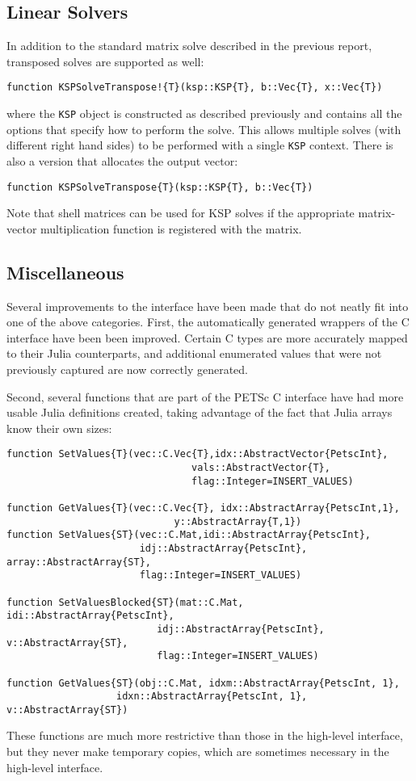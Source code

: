\documentclass{article}
\begin{document}
\subsection{Linear Solvers} \label{sec:ksp}
In addition to the standard matrix solve described in the previous report, 
transposed solves are supported as well:

\begin{verbatim}
function KSPSolveTranspose!{T}(ksp::KSP{T}, b::Vec{T}, x::Vec{T})
\end{verbatim}

\noindent where the \texttt{KSP} object is constructed as described previously and 
contains all the options that specify how to perform the solve.  This
allows multiple solves (with different right hand sides) to be performed 
with a single \texttt{KSP} context.  There is also a version that allocates 
the output vector:

\begin{verbatim}
function KSPSolveTranspose{T}(ksp::KSP{T}, b::Vec{T})
\end{verbatim}

Note that shell matrices can be used for KSP solves if the appropriate 
matrix-vector multiplication function is registered with the matrix.

\subsection{Miscellaneous}
Several improvements to the interface have been made that do not neatly fit 
into one of the above categories.
First, the automatically generated wrappers of the C interface have been 
been improved.  Certain C types are more accurately mapped to their Julia 
counterparts, and additional enumerated values that were not previously
captured are now correctly generated.

Second, several functions that are part of the PETSc C interface have had
more usable Julia definitions created, taking advantage of the fact that Julia
arrays know their own sizes:

\begin{verbatim}
function SetValues{T}(vec::C.Vec{T},idx::AbstractVector{PetscInt},
                                vals::AbstractVector{T},
                                flag::Integer=INSERT_VALUES)

function GetValues{T}(vec::C.Vec{T}, idx::AbstractArray{PetscInt,1}, 
                             y::AbstractArray{T,1})
function SetValues{ST}(vec::C.Mat,idi::AbstractArray{PetscInt},
                       idj::AbstractArray{PetscInt}, array::AbstractArray{ST},
                       flag::Integer=INSERT_VALUES)

function SetValuesBlocked{ST}(mat::C.Mat, idi::AbstractArray{PetscInt}, 
                          idj::AbstractArray{PetscInt}, v::AbstractArray{ST}, 
                          flag::Integer=INSERT_VALUES)

function GetValues{ST}(obj::C.Mat, idxm::AbstractArray{PetscInt, 1}, 
                   idxn::AbstractArray{PetscInt, 1}, v::AbstractArray{ST})
\end{verbatim}

\noindent These functions are much more restrictive than those in the high-level
interface, but they never make temporary copies, which are sometimes 
necessary in the high-level interface.
\end{document}
